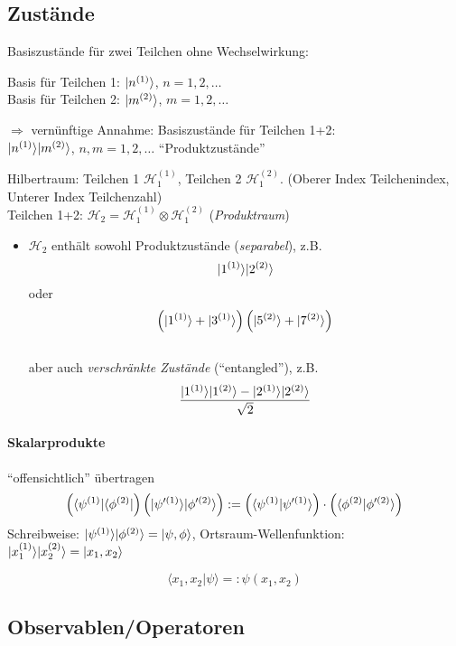 \documentclass[11pt,a4paper]{report}
\begin{document}
\subsection{Zustände}

\newcommand{\bra}[1]{\langle #1 |}
\newcommand{\sprod}[2]{\langle #1 | #2 \rangle}

Basiszustände für zwei Teilchen ohne Wechselwirkung:\par 
Basis für Teilchen 1: $|n^{(1)}\rangle$, $n=1,2,\ldots$\\
Basis für Teilchen 2: $|m^{(2)}\rangle$, $m=1,2,\ldots$\par 
$\Rightarrow$ vernünftige Annahme: Basiszustände für Teilchen 1+2:\\ $|n^{(1)}\rangle|m^{(2)}\rangle$, $n,m=1,2,\ldots$ ``Produktzustände''\par 

Hilbertraum: Teilchen 1 $\mathcal{H}_1^{(1)}$, Teilchen 2 $\mathcal{H}_1^{(2)}$. (Oberer Index Teilchenindex, Unterer Index Teilchenzahl)\\
Teilchen 1+2: $\mathcal{H}_2=\mathcal{H}_1^{(1)}\otimes\mathcal{H}_1^{(2)}$ (\textit{Produktraum})
\begin{itemize}
\item $\mathcal{H}_2$ enthält sowohl Produktzustände (\textit{separabel}), z.B. $$|1^{(1)}\rangle|2^{(2)}\rangle$$ oder $$\left(|1^{(1)}\rangle+|{3}^{(1)}\rangle\right)\left(|5^{(2)}\rangle+|7^{(2)}\rangle\right)$$\\
aber auch \textit{verschränkte Zustände} (``entangled''), z.B. $$\frac{|1^{(1)}\rangle|1^{(2)}\rangle-|2^{(1)}\rangle|2^{(2)}\rangle}{\sqrt{2}}$$
\end{itemize}

\paragraph{Skalarprodukte} ``offensichtlich'' übertragen
$$\left(\bra{\psi^{(1)}}\bra{\phi^{(2)}}\right)\left(\ket{\psi'^{(1)}}\ket{\phi'^{(2)}}\right):=\left(\sprod{\psi^{(1)}}{\psi'^{(1)}}\right)\cdot \left(\sprod{\phi^{(2)}}{\phi'^{(2)}}\right)$$
Schreibweise: $|\psi^{(1)}\rangle|\phi^{(2)}\rangle=|\psi ,\phi\rangle$, 
Ortsraum-Wellenfunktion: $|x_1^{(1)}\rangle|x_2^{(2)}\rangle=|x_1,x_2\rangle$\par 
$$\sprod{x_1,x_2}{\psi}=:\psi (x_1,x_2)$$

\subsection{Observablen/Operatoren}
\end{document}
